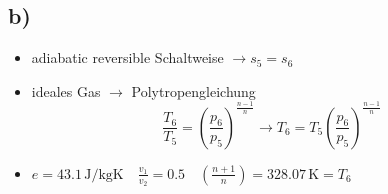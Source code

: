 

\subsection*{b)}

\begin{itemize}
    \item adiabatic reversible Schaltweise $\rightarrow s_5 = s_6$
    \item ideales Gas $\rightarrow$ Polytropengleichung
    \[
    \frac{T_6}{T_5} = \left( \frac{p_6}{p_5} \right)^{\frac{n-1}{n}} \rightarrow T_6 = T_5 \left( \frac{p_6}{p_5} \right)^{\frac{n-1}{n}}
    \]
    \item $e = 43.1 \, \text{J/kgK} \quad \frac{v_1}{v_2} = 0.5 \quad \left( \frac{n+1}{n} \right) = 328.07 \, \text{K} = T_6$
\end{itemize}